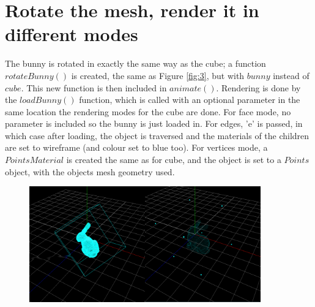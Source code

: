 \documentclass[12pt]{article}
\begin{document}
\section{Rotate the mesh, render it in different modes}
The bunny is rotated in exactly the same way as the cube; a function $rotateBunny()$ is created, the same as Figure \ref{fig:3}, but with $bunny$ instead of $cube$. This new function is then included in $animate()$.
Rendering is done by the $loadBunny()$ function, which is called with an optional parameter in the same location the rendering modes for the cube are done. For face mode, no parameter is included so the bunny is just loaded in. For edges, 'e' is passed, in which case after loading, the object is traversed and the materials of the children are set to wireframe (and colour set to blue too). For vertices mode, a $PointsMaterial$ is created the same as for cube, and the object is set to a $Points$ object, with the objects mesh geometry used.
\begin{figure}[H]  
  \centering
  \includegraphics[width=10cm]{18.png}
  \caption{}
  \label{fig:12}
\end{figure}
\end{document}
